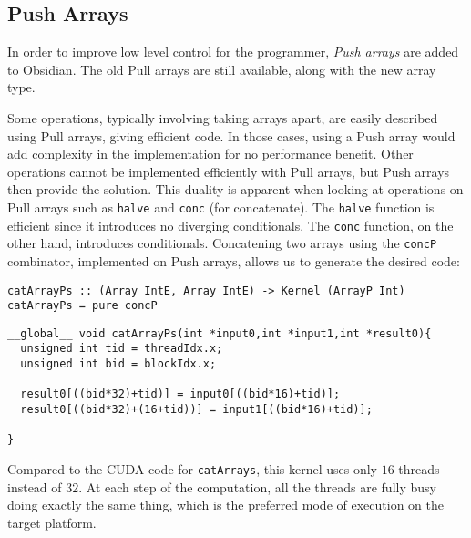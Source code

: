 \subsection{Push Arrays}

In order to improve low level control for the programmer, {\em Push
arrays} are added to Obsidian. The old Pull arrays are still available,
along with the new array type. 

Some operations, typically involving taking arrays apart,
are easily described using Pull arrays, giving
efficient code. In those cases, using a Push array would add complexity in the 
implementation for no performance benefit.
Other operations cannot be implemented efficiently
with Pull arrays, but Push arrays then provide the solution.
This duality is apparent when looking at operations on Pull arrays such as
{\tt halve} and {\tt conc} (for concatenate). 
The {\tt halve} function is efficient since it introduces no diverging 
conditionals. The {\tt conc} function, on the other hand, introduces conditionals.
Concatening two arrays using the {\tt concP} combinator, implemented on Push arrays, 
allows us to generate the desired code:

\begin{codesize}
\begin{verbatim}
catArrayPs :: (Array IntE, Array IntE) -> Kernel (ArrayP Int)
catArrayPs = pure concP
\end{verbatim}
\end{codesize} 

\begin{codesize}
\begin{verbatim}
__global__ void catArrayPs(int *input0,int *input1,int *result0){
  unsigned int tid = threadIdx.x;
  unsigned int bid = blockIdx.x;
  
  result0[((bid*32)+tid)] = input0[((bid*16)+tid)];
  result0[((bid*32)+(16+tid))] = input1[((bid*16)+tid)];
  
}
\end{verbatim}
\end{codesize}

\noindent
Compared to the CUDA code for {\tt catArrays}, this kernel 
uses only $16$ threads instead of $32$. At each step of the computation, all 
the threads are fully busy doing exactly the same thing, which is the preferred 
mode of execution on the target platform. 
 


